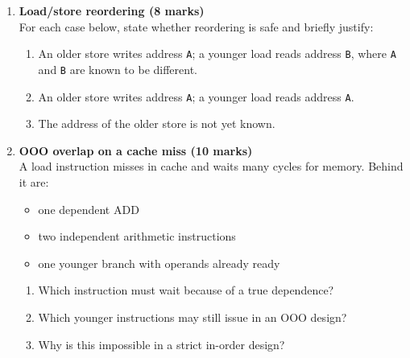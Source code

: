 \documentclass[11pt]{article}
\begin{document}
\begin{enumerate}[label=\textbf{B\arabic*.}]
  \item \textbf{Load/store reordering (8 marks)}\\
  For each case below, state whether reordering is safe and briefly justify:
  \begin{enumerate}[label=(\alph*)]
    \item An older store writes address \texttt{A}; a younger load reads address \texttt{B}, where \texttt{A} and \texttt{B} are known to be different.
    \item An older store writes address \texttt{A}; a younger load reads address \texttt{A}.
    \item The address of the older store is not yet known.
  \end{enumerate}

  \item \textbf{OOO overlap on a cache miss (10 marks)}\\
  A load instruction misses in cache and waits many cycles for memory. Behind it are:
  \begin{itemize}[leftmargin=1.5em]
    \item one dependent ADD
    \item two independent arithmetic instructions
    \item one younger branch with operands already ready
  \end{itemize}
  \begin{enumerate}[label=(\alph*)]
    \item Which instruction must wait because of a true dependence?
    \item Which younger instructions may still issue in an OOO design?
    \item Why is this impossible in a strict in-order design?
  \end{enumerate}
\end{enumerate}
\end{document}
